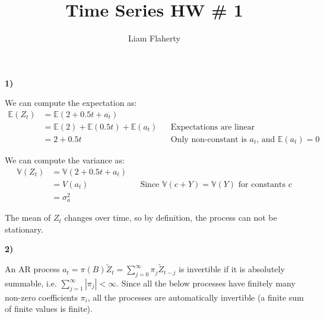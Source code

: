 \documentclass[12pt, letterpaper]{article}
\title{Time Series HW \# 1}
\author{Liam Flaherty}
\date{\parbox{\linewidth}{\centering%
		Professor Martin\endgraf\bigskip
		NCSU: ST546-001\endgraf\bigskip
		August 29, 2024 \endgraf}}
\theoremstyle{definition}
\numberwithin{equation}{section}
\newcommand{\+}[1]{+_{\scalebox{.375}{#1}}}
\newcommand{\E}{\mathbb{E}}
\newcommand{\V}{\mathbb{V}}
\newcommand{\1}{\mathbbm{1}}
\begin{document}
\maketitle
\thispagestyle{empty}

\newpage\clearpage\noindent


\noindent\textbf{1) }
\vspace{\baselineskip}

We can compute the expectation as:
\begin{align*}
	\E(Z_t)&=\E(2+0.5t+a_t)\\
	&=\E(2)+\E(0.5t)+\E(a_t) &&\text{Expectations are linear}\\
	&=2+0.5t &&\text{Only non-constant is $a_t$, and $\E(a_t)=0$}
\end{align*}

We can compute the variance as:
\begin{align*}
	\V(Z_t)&=\V(2+0.5t+a_t)\\
	&=V(a_t) &&\text{Since $\V(c+Y)=\V(Y)$ for constants $c$}\\
	&=\sigma_a^2
\end{align*}

The mean of $Z_t$ changes over time, so by definition, the process can not be stationary.
\vspace{\baselineskip}





\newpage
\noindent\textbf{2) }
\vspace{\baselineskip}

An AR process $a_t=\pi(B)\widetilde{Z}_t=\sum\limits_{j=0}^{\infty}\pi_j\tilde{Z}_{t-j}$ is invertible if it is absolutely summable, i.e. $\sum\limits_{j=1}^\infty|\pi_j|<\infty$. Since all the below processes have finitely many non-zero coefficients $\pi_i$, all the processes are automatically invertible (a finite sum of finite values is finite).
\vspace{\baselineskip}
\end{document}
